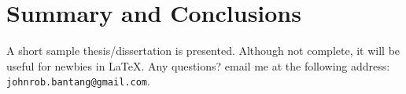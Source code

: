 \chapter{Summary and Conclusions}

\hspace{\parindent} A short sample thesis/dissertation is
presented. Although not complete, it will be useful for newbies in
\LaTeX. Any questions? email me at the following address:
\verb+johnrob.bantang@gmail.com+.
